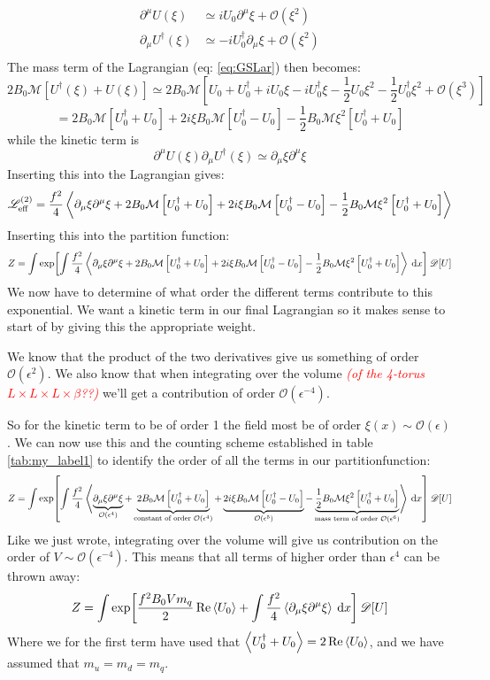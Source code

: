 \documentclass[a4,10pt,titlepage]{article}
\renewcommand\[{\begin{equation*}}
\renewcommand\]{\end{equation*}}
\newcommand{\BigO}{\mathcal{O}}
\numberwithin{equation}{section}
\newcommand{\LeadLar}{\Lar_{\text{eff}}^{(2)}}
\newcommand{\PD}{\mathscr{D}}
\newcommand{\lp}{\left}
\newcommand{\rp}{\right}
\newcommand{\edit}[1]{\textcolor{red}{\textit{#1}}}
\newcommand{\Lar}{\mathscr{L}}
\begin{document}
\begin{align*}
\partial^\mu U(\xi)&\simeq iU_0\partial^\mu\xi+\mathcal{O}(\xi^2)\\
\partial_\mu U^\dagger(\xi)&\simeq -iU_0^\dagger \partial_\mu\xi+\mathcal{O}(\xi^2)\\
\end{align*}
The mass term of the Lagrangian (eq: \ref{eq:GSLar}) then becomes:
\[
2B_0\mathcal{M}\lp[U^\dagger(\xi)+U(\xi) \rp]\simeq 2B_0\mathcal{M}\lp[ U_0+U_0^\dagger+iU_0\xi-iU_0^\dagger\xi-\frac{1}{2}U_0\xi^2-\frac{1}{2} U_0^\dagger \xi^2+\mathcal{O}(\xi^3) \rp]
\]
\[
=2B_0\mathcal{M}\lp[U_0^\dagger+U_0 \rp]+2i\xi B_0\mathcal{M}\lp[U_0^\dagger-U_0 \rp]-\frac{1}{2} B_0\mathcal{M}\xi^2\lp[U_0^\dagger+U_0 \rp]
\]
while the kinetic term is
\[
\partial^\mu U(\xi)\partial_\mu U^\dagger(\xi)\simeq \partial_\mu\xi\partial^\mu\xi
\]
Inserting this into the Lagrangian gives:
\[
\LeadLar =\frac{f^2}{4}\expval{\partial_\mu\xi\partial^\mu\xi+2B_0\mathcal{M}\lp[U_0^\dagger+U_0 \rp]+2i\xi B_0\mathcal{M}\lp[U_0^\dagger-U_0 \rp]-\frac{1}{2} B_0\mathcal{M}\xi^2\lp[U_0^\dagger+U_0 \rp]}
\]
Inserting this into the partition function:
\[
Z=\int\exp[\int\frac{f^2}{4}\expval{\partial_\mu\xi\partial^\mu\xi+2B_0\mathcal{M}\lp[U_0^\dagger+U_0 \rp]+2i\xi B_0\mathcal{M}\lp[U_0^\dagger-U_0 \rp]-\frac{1}{2} B_0\mathcal{M}\xi^2\lp[U_0^\dagger+U_0 \rp]}\:\dd x ]\:\PD[U]
\]
We now have to determine of what order the different terms contribute to this exponential. We want a kinetic term in our final Lagrangian so it makes sense to start of by giving this the appropriate weight. 

We know that the product of the two derivatives give us something of order $\BigO(\epsilon^2)$. We also know that when integrating over the volume \edit{(of the 4-torus $L\times L\times L\times \beta$??)} we'll get a contribution of order $\BigO(\epsilon^{-4})$. 

So for the kinetic term to be of order 1 the field most be of order $\xi(x)\sim \BigO(\epsilon)$. We can now use this and the counting scheme established in table \ref{tab:my_label1} to identify the order of all the terms in our partitionfunction:
\[
Z=\int\exp[\int\frac{f^2}{4}\expval{\underbrace{\partial_\mu\xi\partial^\mu\xi}_{\mathcal{O}(\epsilon^4)}+\underbrace{2B_0\mathcal{M}\lp[U_0^\dagger+U_0 \rp]}_{\text{constant of order }\mathcal{O}(\epsilon^4) }+\underbrace{2i\xi B_0\mathcal{M}\lp[U_0^\dagger-U_0 \rp]}_{\BigO(\epsilon^5)}-\underbrace{\frac{1}{2} B_0\mathcal{M}\xi^2\lp[U_0^\dagger+U_0 \rp]}_{\text{mass term of order }\BigO(\epsilon^6)}}\:\dd x ]\:\PD[U]
\]
Like we just wrote, integrating over the volume will give us contribution on the order of $V\sim \BigO (\epsilon^{-4})$. This means that all terms of higher order than $\epsilon^4$ can be thrown away:
\[
Z=\int\exp[\frac{f^2B_0Vm_q}{2}\Re\expval{U_0 }+\int\frac{f^2}{4}\expval{\partial_\mu\xi\partial^\mu\xi}\:\dd x ]\:\PD[U]
\]
Where we for the first term have used that $\expval{U_0^\dagger+U_0}=2\Re\expval{U_0}$, and we have assumed that $m_u=m_d=m_q$.
\end{document}
